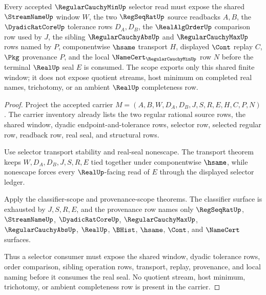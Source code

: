 \begin{theorem}
\label{thm:regular-cauchy-min-shared-window-scope}
Every accepted $\RegularCauchyMinUp$ selector read must expose the shared $\StreamNameUp$ window $W$, the two $\RegSeqRatUp$ source readbacks $A,B$, the $\DyadicRatCoreUp$ tolerance rows $D_A,D_B$, the $\RealAlgOrderUp$ comparison row used by $J$, the sibling $\RegularCauchyAbsUp$ and $\RegularCauchyMaxUp$ rows named by $P$, componentwise $\hsame$ transport $H$, displayed $\Cont$ replay $C$, $\Pkg$ provenance $P$, and the local $\NameCert_{\RegularCauchyMinUp}$ row $N$ before the terminal $\RealUp$ seal $E$ is consumed. The scope exports only this shared finite window; it does not expose quotient streams, host minimum on completed real names, trichotomy, or an ambient $\RealUp$ completeness row.
\end{theorem}
\begin{proof}
Project the accepted carrier $M=(A,B,W,D_A,D_B,J,S,R,E,H,C,P,N)$. The carrier inventory already lists the two regular rational source rows, the shared window, dyadic endpoint-and-tolerance rows, selector row, selected regular row, readback row, real seal, and structural rows.

Use selector transport stability and real-seal nonescape. The transport theorem keeps $W,D_A,D_B,J,S,R,E$ tied together under componentwise $\hsame$, while nonescape forces every $\RealUp$-facing read of $E$ through the displayed selector ledger.

Apply the classifier-scope and provenance-scope theorems. The classifier surface is exhausted by $J,S,R,E$, and the provenance row names only $\RegSeqRatUp$, $\StreamNameUp$, $\DyadicRatCoreUp$, $\RegularCauchyMaxUp$, $\RegularCauchyAbsUp$, $\RealUp$, $\BHist$, $\hsame$, $\Cont$, and $\NameCert$ surfaces.

Thus a selector consumer must expose the shared window, dyadic tolerance rows, order comparison, sibling operation rows, transport, replay, provenance, and local naming before it consumes the real seal. No quotient stream, host minimum, trichotomy, or ambient completeness row is present in the carrier.
\end{proof}

